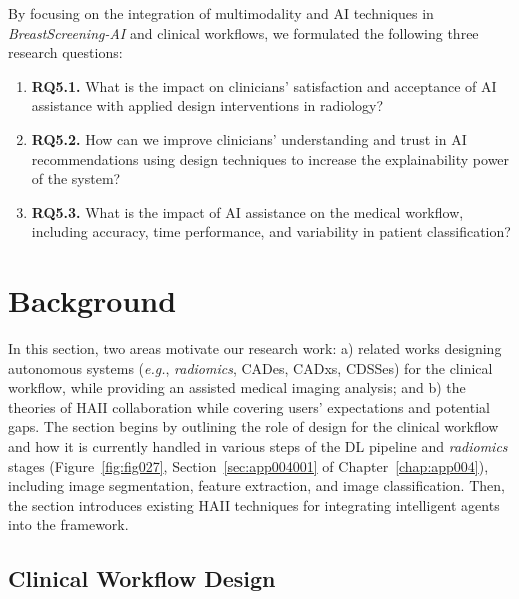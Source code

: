 \vspace{2.50mm}

\noindent
By focusing on the integration of multimodality and \ac{AI} techniques in {\it BreastScreening-AI} and clinical workflows, we formulated the following three research questions:

\vspace{0.05mm}

\begin{enumerate}
\item {\bf RQ5.1.} What is the impact on clinicians' satisfaction and acceptance of \ac{AI} assistance with applied design interventions in radiology?
\item {\bf RQ5.2.} How can we improve clinicians' understanding and trust in \ac{AI} recommendations using design techniques to increase the explainability power of the system?
\item {\bf RQ5.3.} What is the impact of \ac{AI} assistance on the medical workflow, including accuracy, time performance, and variability in patient classification?
\end{enumerate}

\section{Background}
\label{sec:chap005002}

In this section, two areas motivate our research work:
a) related works designing autonomous systems ({\it e.g.}, {\it radiomics}, \acp{CADe}, \acp{CADx}, \acp{CDSSe}) for the clinical workflow, while providing an assisted medical imaging analysis; and
b) the theories of \ac{HAII} collaboration while covering users' expectations and potential gaps.
The section begins by outlining the role of design for the clinical workflow and how it is currently handled in various steps of the \ac{DL} pipeline and {\it radiomics} stages (Figure~\ref{fig:fig027}, Section~\ref{sec:app004001} of Chapter~\ref{chap:app004}), including image segmentation, feature extraction, and image classification.
Then, the section introduces existing \ac{HAII} techniques for integrating intelligent agents into the framework.

\subsection{Clinical Workflow Design}
\label{sec:chap005002001}

